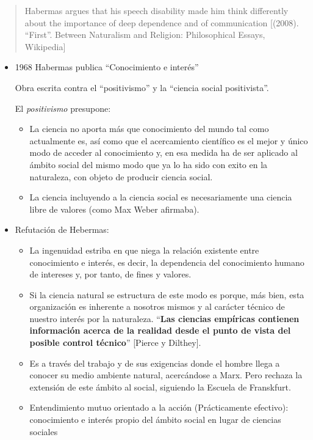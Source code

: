 \documentclass[
  letterpaper,
  DIV=11,
  numbers=noendperiod]{scrreprt}
\begin{document}
\begin{quote}
Habermas argues that his speech disability made him think differently
about the importance of deep dependence and of communication {[}(2008).
``First''. Between Naturalism and Religion: Philosophical Essays,
Wikipedia{]}
\end{quote}

\begin{itemize}
\item
  1968 Habermas publica ``Conocimiento e interés''

  Obra escrita contra el ``positivismo'' y la ``ciencia social
  positivista''.

  El \emph{positivismo} presupone:

  \begin{itemize}
  \item
    La ciencia no aporta más que conocimiento del mundo tal como
    actualmente es, así como que el acercamiento científico es el mejor
    y único modo de acceder al conocimiento y, en esa medida ha de ser
    aplicado al ámbito social del mismo modo que ya lo ha sido con exito
    en la naturaleza, con objeto de producir ciencia social.
  \item
    La ciencia incluyendo a la ciencia social es necesariamente una
    ciencia libre de valores (como Max Weber afirmaba).
  \end{itemize}
\item
  Refutación de Hebermas:

  \begin{itemize}
  \item
    La ingenuidad estriba en que niega la relación existente entre
    conocimiento e interés, es decir, la dependencia del conocimiento
    humano de intereses y, por tanto, de fines y valores.
  \item
    Si la ciencia natural se estructura de este modo es porque, más
    bien, esta organización es inherente a nosotros mismos y al carácter
    técnico de nuestro interés por la naturaleza. ``\textbf{Las ciencias
    empíricas contienen información acerca de la realidad desde el punto
    de vista del posible control técnico}'' {[}Pierce y Dilthey{]}.
  \item
    Es a través del trabajo y de sus exigencias donde el hombre llega a
    conocer su medio ambiente natural, acercándose a Marx. Pero rechaza
    la extensión de este ámbito al social, siguiendo la Escuela de
    Franskfurt.
  \item
    Entendimiento mutuo orientado a la acción (Prácticamente efectivo):
    conocimiento e interés propio del ámbito social en lugar de ciencias
    sociales


\end{itemize}
\end{itemize}
\end{document}
